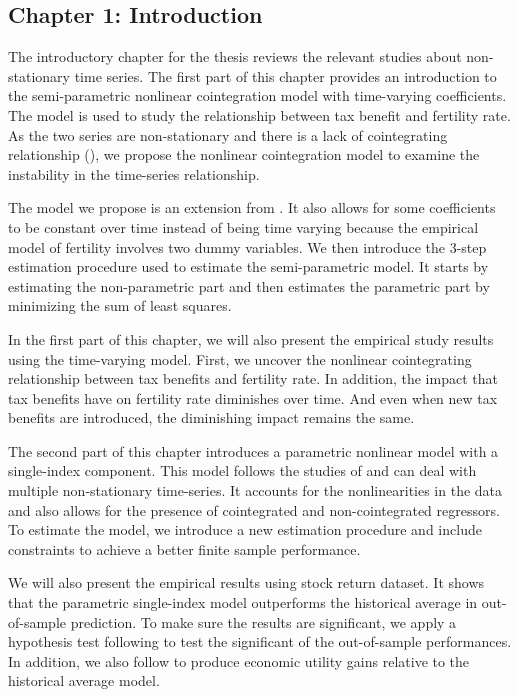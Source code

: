 \documentclass[a4paper,12pt,times,numbered,print,index]{report}
\numberwithin{equation}{section}
\begin{document}
\subsection*{Chapter 1: Introduction}

The introductory chapter for the thesis reviews the relevant studies about non-stationary time series. The first part of this chapter provides an introduction to the semi-parametric nonlinear cointegration model with time-varying coefficients. The model is used to study the relationship between tax benefit and fertility rate. As the two series are non-stationary and there is a lack of cointegrating relationship (\cite{crump2011fertility}), we propose the nonlinear cointegration model to examine the instability in the time-series relationship. 

The model we propose is an extension from \cite{phillips2017estimating}. It also allows for some coefficients to be constant over time instead of being time varying because the empirical model of fertility involves two dummy variables.  We then introduce the 3-step estimation procedure used to estimate the semi-parametric model. It starts by estimating the non-parametric part and then estimates the parametric part by minimizing the sum of least squares. 

In the first part of this chapter, we will also present the empirical study results using the time-varying model. First, we uncover the nonlinear cointegrating relationship between tax benefits and fertility rate. In addition, the impact that tax benefits have on fertility rate diminishes over time. And even when new tax benefits are introduced, the diminishing impact remains the same.

The second part of this chapter introduces a parametric nonlinear model with a single-index component. This model follows the studies of \cite{dong2016estimation} and can deal with multiple non-stationary time-series. It accounts for the nonlinearities in the data and also allows for the presence of cointegrated and non-cointegrated regressors. To estimate the model, we introduce a new estimation procedure and include constraints to achieve a better finite sample performance. 

We will also present the empirical results using stock return dataset. It shows that the parametric single-index model outperforms the historical average in out-of-sample prediction. To make sure the results are significant, we apply a hypothesis test following \cite{clark2007approximately} to test the significant of the out-of-sample performances. In addition, we also follow \cite{neely2014forecasting} to produce economic utility gains relative to the historical average model. 
\end{document}
